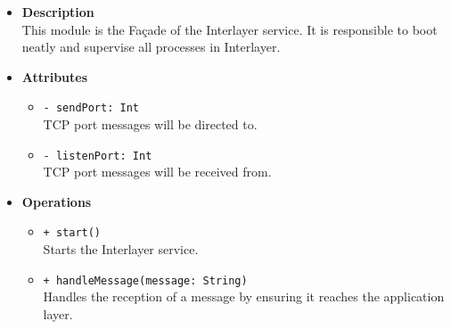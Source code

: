 \FloatBarrier
\begin{itemize}
  \item \textbf{Description} \\
    This module is the Fa\c cade of the Interlayer service. It is responsible to
    boot neatly and supervise all processes in Interlayer.
  \item \textbf{Attributes}
    \begin{itemize}
      \item \texttt{- sendPort: Int} \\
    TCP port messages will be directed to.
      \item \texttt{- listenPort: Int} \\
    TCP port messages will be received from.
    \end{itemize}
  \item \textbf{Operations}
  \begin{itemize}
    \item \texttt{+ start()} \\
    Starts the Interlayer service.
    \item \texttt{+ handleMessage(message: String)} \\
    Handles the reception of a message by ensuring it reaches the application
    layer.
  \end{itemize}
\end{itemize}

